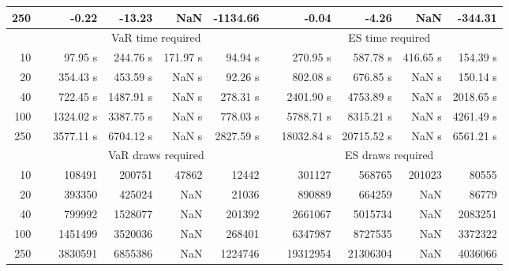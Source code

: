 {{\begin{longtable}{rr rrrr r rrrr}
250 && -0.22 & -13.23 &  NaN & -1134.66 && -0.04 & -4.26 &  NaN & -344.31 \\ 
\hline 
 & & \multicolumn{4}{c}{VaR time required} && \multicolumn{4}{c}{ES time required} \\ \cline{3-6}  \cline{8-11}
10 & & 97.95 s & 244.76 s & 171.97 s & 94.94 s && 270.95 s & 587.78 s & 416.65 s & 154.39 s \\ 
20 & & 354.43 s & 453.59 s &  NaN s & 92.26 s && 802.08 s & 676.85 s &  NaN s & 150.14 s \\ 
40 & & 722.45 s & 1487.91 s &  NaN s & 278.31 s && 2401.90 s & 4753.89 s &  NaN s & 2018.65 s \\ 
100 & & 1324.02 s & 3387.75 s &  NaN s & 778.03 s && 5788.71 s & 8315.21 s &  NaN s & 4261.49 s \\ 
250 & & 3577.11 s & 6704.12 s &  NaN s & 2827.59 s && 18032.84 s & 20715.52 s &  NaN s & 6561.21 s \\ 
\hline 
 && \multicolumn{4}{c}{VaR draws required} &&   \multicolumn{4}{c}{ES draws required} \\  \cline{3-6}  \cline{8-11} 
10 & & 108491 & 200751 & 47862 & 12442 && 301127 & 568765 & 201023  & 80555 \\ 
20 & & 393350 & 425024 & NaN & 21036 && 890889 & 664259 & NaN  & 86779 \\ 
40 & & 799992 & 1528077 & NaN & 201392 && 2661067 & 5015734 & NaN  & 2083251 \\ 
100 & & 1451499 & 3520036 & NaN & 268401 && 6347987 & 8727535 & NaN  & 3372322 \\ 
250 & & 3830591 & 6855386 & NaN & 1224746 && 19312954 & 21306304 & NaN  & 4036066 \\ 
\hline 
\end{longtable} 
} 
} 
